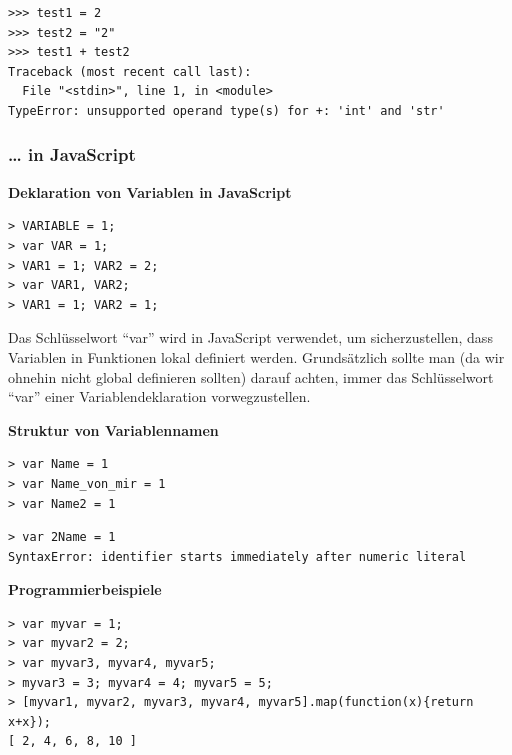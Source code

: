 \begin{verbatim}
>>> test1 = 2
>>> test2 = "2"
>>> test1 + test2
Traceback (most recent call last):
  File "<stdin>", line 1, in <module>
TypeError: unsupported operand type(s) for +: 'int' and 'str'
\end{verbatim}


\subsubsection{\texorpdfstring{{\ldots{} in
JavaScript}}{\ldots{} in JavaScript}}

\vspace{0.5cm}\par\noindent\textbf{Deklaration von Variablen in JavaScript}\vspace{0.5cm}

\begin{verbatim}
> VARIABLE = 1;
> var VAR = 1;
> VAR1 = 1; VAR2 = 2;
> var VAR1, VAR2;
> VAR1 = 1; VAR2 = 1;
\end{verbatim}

{Das Schlüsselwort ``var'' wird in JavaScript verwendet, um
sicherzustellen, dass Variablen in Funktionen lokal definiert werden.
Grundsätzlich sollte man (da wir ohnehin nicht global definieren
sollten) darauf achten, immer das Schlüsselwort ``var'' einer
Variablendeklaration vorwegzustellen.}



\vspace{0.5cm}\par\noindent\textbf{Struktur von Variablennamen}\vspace{0.5cm}

\begin{verbatim}
> var Name = 1
> var Name_von_mir = 1
> var Name2 = 1
\end{verbatim}

\begin{verbatim}
> var 2Name = 1
SyntaxError: identifier starts immediately after numeric literal
\end{verbatim}



\vspace{0.5cm}\par\noindent\textbf{Programmierbeispiele}\vspace{0.5cm}

\begin{verbatim}
> var myvar = 1;
> var myvar2 = 2;
> var myvar3, myvar4, myvar5;
> myvar3 = 3; myvar4 = 4; myvar5 = 5;
> [myvar1, myvar2, myvar3, myvar4, myvar5].map(function(x){return x+x});
[ 2, 4, 6, 8, 10 ]
\end{verbatim}



